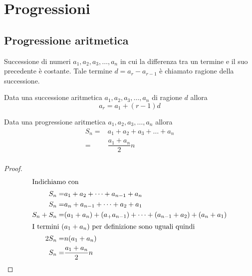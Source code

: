 
\chapter{Progressioni}
\section{Progressione aritmetica}
\begin{defn}\label{defn:ProgAritm1}
	Successione di numeri $a_1,a_2,a_3,\dots,a_n$ in cui la differenza tra un termine e il suo precedente è costante. Tale termine $d=a_r-a_{r-1}$ è chiamato ragione della successione.
\end{defn}
\begin{prop}
	Data una successione aritmetica $a_1,a_2,a_3,\dots,a_n$ di ragione $d$ allora\[a_r=a_1+(r-1)d\]
\end{prop}
\begin{thm}\label{thm:SommaProgAritm1}
Data una progressione aritmetica $a_1,a_2,a_3,\dots,a_n$ allora
\begin{align*}
	S_n=&a_1+a_2+a_3+\dots+a_n\\
	=&\dfrac{a_1+a_n}{2}n\\
\end{align*}
\end{thm}
\begin{proof}
\begin{align*}
\intertext{Indichiamo con}
S_n=&a_1+a_2+\dots+a_{n-1}+a_n\\
S_n=&a_n+a_{n-1}+\dots+a_2+a_1\\
S_n+S_n=&(a_1+a_n)+(a_+a_{n-1})+\dots+(a_{n-1}+a_2)+(a_n+a_1)\\
\intertext{I termini $(a_1+a_n)$ per definizione sono uguali quindi}
2S_n=&n(a_1+a_n)\\
S_n=&\dfrac{a_1+a_n}{2}n
\end{align*}
\end{proof}
